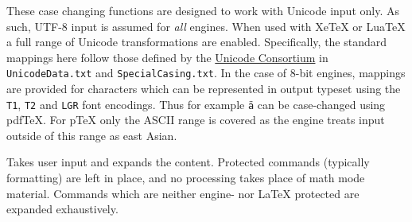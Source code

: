 \documentclass[oneside]{book}
\begin{document}
These case changing functions are designed to work with Unicode input only.
As such, UTF-8 input is assumed for \emph{all} engines.
When used with XeTeX or LuaTeX a full range of Unicode transformations
are enabled. Specifically, the standard mappings
here follow those defined by the \href{http://www.unicode.org}
{Unicode Consortium} in \texttt{UnicodeData.txt} and
\texttt{SpecialCasing.txt}. In the case of $8$-bit engines, mappings
are provided for characters which can be represented in output typeset
using the \verb|T1|, \verb|T2| and \verb|LGR| font encodings.
Thus for example \texttt{ä} can be
case-changed using pdfTeX.  For pTeX only the ASCII range is
covered as the engine treats input outside of this range as east Asian.


\begin{function}{\TextExpand}
\begin{syntax}
 
\end{syntax}
Takes user input  and expands the content.
Protected commands (typically formatting) are left in place,
and no processing takes place of math mode material.
Commands which are neither engine- nor \LaTeX{} protected are expanded exhaustively.
\end{function}
\end{document}
